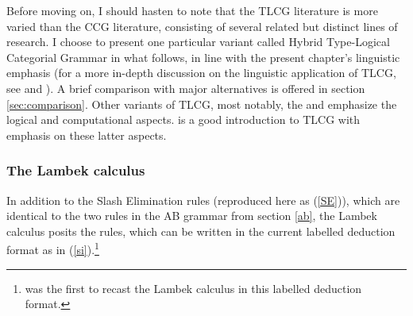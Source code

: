 \documentclass[output=paper]{langsci/langscibook}
\begin{document}
Before moving on, I should hasten to note that the TLCG literature is
more varied than the CCG literature, consisting of several related but
distinct lines of research. I choose to present one particular variant
called Hybrid Type-Logical Categorial Grammar \citep{KubotaLevineBook}
in what follows, in line with the present chapter's linguistic
emphasis (for a more in-depth discussion on the linguistic application
of TLCG, see \citet{Carpenter98a-u} and \citet{KubotaLevineBook}). A
brief comparison with major alternatives is offered in section
\ref{sec:comparison}. Other variants of TLCG, most notably, the
 \citep{Moortgat2011a-u} and
 \citep{morrill2011} emphasize the logical
and computational aspects. \citet{mootretore2012} is a good
introduction to TLCG with emphasis on these latter aspects.


\subsubsection{The Lambek calculus \label{lambek}}

In addition to the Slash Elimination rules (reproduced here as
(\ref{SE})), which are identical to the two rules in the AB grammar
from section \ref{ab}, the Lambek calculus posits the  rules, which can be written in the current labelled
deduction format as in (\ref{si}).\footnote{\citet{Morrill94a-u} was
the first to recast the Lambek calculus in this labelled deduction
format.}
\end{document}
